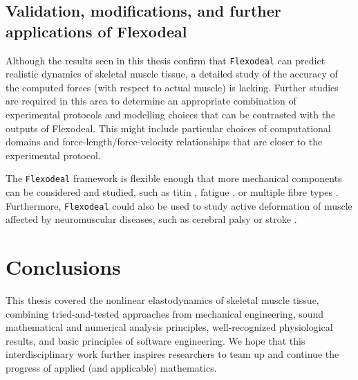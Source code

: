 \documentclass{sfuthesis}
\numberwithin{equation}{section}
\numberwithin{figure}{chapter}
\numberwithin{table}{chapter}
\theoremstyle{definition}
\begin{document}
\subsection{Validation, modifications, and further applications of Flexodeal}

Although the results seen in this thesis confirm that \texttt{Flexodeal} can predict realistic dynamics of skeletal muscle tissue, a detailed study of the accuracy of the computed forces (with respect to actual muscle) is lacking. Further studies are required in this area to determine an appropriate combination of experimental protocols and modelling choices that can be contrasted with the outputs of Flexodeal. This might include particular choices of computational domains and force-length/force-velocity relationships that are closer to the experimental protocol.

The \texttt{Flexodeal} framework is flexible enough that more mechanical components can be considered and studied, such as titin \cite{SampaioDeOliveiraUchida2025}, fatigue \cite{BolReese2009Fatigue}, or multiple fibre types \cite{MarcucciEtAl2017}.
Furthermore, \texttt{Flexodeal} could also be used to study active deformation of muscle affected by neuromuscular diseases, such as cerebral palsy or stroke \cite{KonnoEtAl2022_CP,Lieber2017withSabrina}.

\section{Conclusions}

This thesis covered the nonlinear elastodynamics of skeletal muscle tissue, combining tried-and-tested approaches from mechanical engineering, sound mathematical and numerical analysis principles, well-recognized physiological results, and basic principles of software engineering. We hope that this interdisciplinary work further inspires researchers to team up and continue the progress of applied (and applicable) mathematics.




%
%
%
%
%

\backmatter%
    
    
\end{document}

